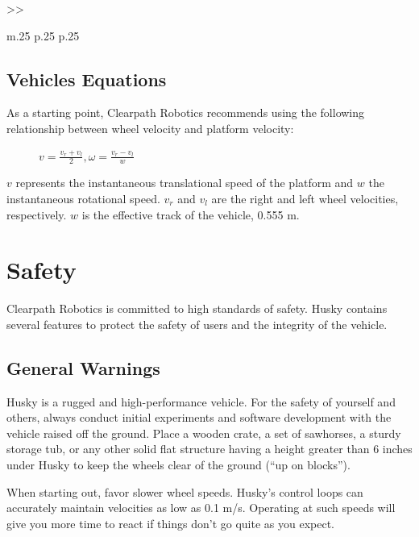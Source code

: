 \documentclass[]{clearpath-latex/clearpath-manual}
\begin{document}
\begin{table}[h]
\begin{tabular}{>{}>{\raggedright}m{.25\textwidth} p{.25\textwidth} p{.25\textwidth}}
	\end{tabular}
\newline
\caption{Husky System Specifications}
\label{systemspecs}
\end{table}

\newpage
\subsection{Vehicles Equations}

As a starting point, Clearpath Robotics recommends using the following relationship between wheel velocity and platform velocity:
\begin{figure}[h]
\centering
$v=\frac{v_r+v_l}{2} , \omega=\frac{v_r-v_l}{w}$
\end{figure}

$v$ represents the instantaneous translational speed of the platform and $w$ the instantaneous rotational speed. $v_r$ and $v_l$ are
the right and left wheel velocities, respectively. $w$ is the effective track of the vehicle, 0.555 m.

\section{Safety}
Clearpath Robotics is committed to high standards of safety. Husky contains several features to protect the safety of users and the integrity of the vehicle.

\subsection{General Warnings}

Husky is a rugged and high-performance vehicle. For the safety of yourself and others, 
always conduct initial experiments and software development with the vehicle raised off the ground. 
Place a wooden crate, a set of sawhorses, a sturdy storage tub, or any other solid flat structure having a 
height greater than 6 inches under Husky to keep the wheels clear of the ground (“up on blocks”).

When starting out, favor slower wheel speeds. Husky’s control loops can accurately maintain velocities 
as low as 0.1 m/s. Operating at such speeds will give you more time to react if things don’t go quite as you expect.
\end{document}
